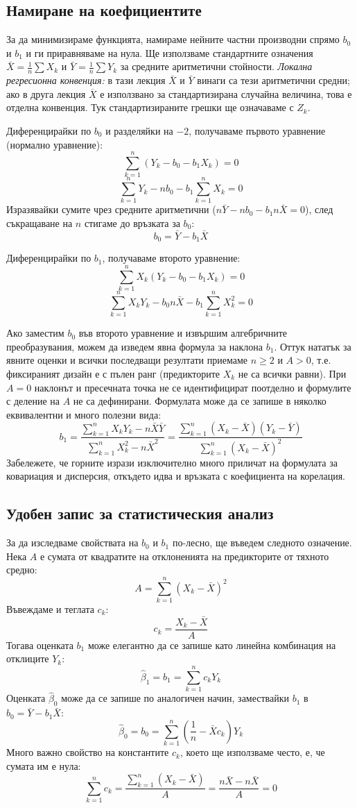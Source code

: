 \subsection{Намиране на коефициентите}
За да минимизираме функцията, намираме нейните частни производни спрямо $b_0$ и $b_1$ и ги приравняваме на нула. Ще използваме стандартните означения $\bar{X} = \frac{1}{n}\sum X_k$ и $\bar{Y} = \frac{1}{n}\sum Y_k$ за средните аритметични стойности. \emph{Локална регресионна конвенция:} в тази лекция $\bar{X}$ и $\bar{Y}$ винаги са тези аритметични средни; ако в друга лекция $\overline{X}$ е използвано за стандартизирана случайна величина, това е отделна конвенция. Тук стандартизираните грешки ще означаваме с $Z_k$.

Диференцирайки по $b_0$ и разделяйки на $-2$, получаваме първото уравнение (нормално уравнение):
\[
\sum_{k=1}^n (Y_k - b_0 - b_1 X_k) = 0
\]
\[
\sum_{k=1}^n Y_k - n b_0 - b_1 \sum_{k=1}^n X_k = 0
\]
Изразявайки сумите чрез средните аритметични ($n \bar{Y} - n b_0 - b_1 n \bar{X} = 0$), след съкращаване на $n$ стигаме до връзката за $b_0$:
\[
b_0 = \bar{Y} - b_1 \bar{X}
\]

Диференцирайки по $b_1$, получаваме второто уравнение:
\[
\sum_{k=1}^n X_k (Y_k - b_0 - b_1 X_k) = 0
\]
\[
\sum_{k=1}^n X_k Y_k - b_0 n \bar{X} - b_1 \sum_{k=1}^n X_k^2 = 0
\]

Ако заместим $b_0$ във второто уравнение и извършим алгебричните преобразувания, можем да изведем явна формула за наклона $b_1$. Оттук нататък за явните оценки и всички последващи резултати приемаме $n\geq 2$ и $A>0$, т.е. фиксираният дизайн е с пълен ранг (предикторите $X_k$ не са всички равни). При $A=0$ наклонът и пресечната точка не се идентифицират поотделно и формулите с деление на $A$ не са дефинирани. Формулата може да се запише в няколко еквивалентни и много полезни вида:
\[
b_1 = \frac{\sum_{k=1}^n X_k Y_k - n \bar{X}\bar{Y}}{\sum_{k=1}^n X_k^2 - n \bar{X}^2} = \frac{\sum_{k=1}^n (X_k - \bar{X})(Y_k - \bar{Y})}{\sum_{k=1}^n (X_k - \bar{X})^2}
\]
Забележете, че горните изрази изключително много приличат на формулата за ковариация и дисперсия, откъдето идва и връзката с коефициента на корелация.

\subsection{Удобен запис за статистическия анализ}
За да изследваме свойствата на $b_0$ и $b_1$ по-лесно, ще въведем следното означение. Нека $A$ е сумата от квадратите на отклоненията на предикторите от тяхното средно:
\[
A = \sum_{k=1}^n (X_k - \bar{X})^2
\]
Въвеждаме и теглата $c_k$:
\[
c_k = \frac{X_k - \bar{X}}{A}
\]
Тогава оценката $b_1$ може елегантно да се запише като линейна комбинация на отклиците $Y_k$:
\[
\hat{\beta}_1 = b_1 = \sum_{k=1}^n c_k Y_k
\]
Оценката $\hat{\beta}_0$ може да се запише по аналогичен начин, замествайки $b_1$ в $b_0 = \bar{Y} - b_1 \bar{X}$:
\[
\hat{\beta}_0 = b_0 = \sum_{k=1}^n \left( \frac{1}{n} - \bar{X} c_k \right) Y_k
\]
Много важно свойство на константите $c_k$, което ще използваме често, е, че сумата им е нула:
\[
\sum_{k=1}^n c_k = \frac{\sum_{k=1}^n (X_k - \bar{X})}{A} = \frac{n\bar{X} - n\bar{X}}{A} = 0
\]

